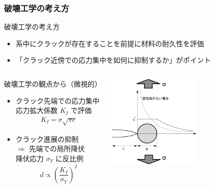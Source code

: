 \documentclass[11pt, dvipdfmx]{beamer}
\begin{document}
\begin{frame}
\frametitle{破壊工学の考え方}
\begin{exampleblock}{破壊工学の考え方}

\begin{itemize}
\item
系中にクラックが存在することを前提に材料の耐久性を評価
\item
\alert{「クラック近傍での応力集中を如何に抑制するか」}がポイント
\end{itemize}
\end{exampleblock}

\begin{columns}[totalwidth=1\textwidth]
\begin{alertblock}{破壊工学の観点から（微視的）}
	\begin{itemize}
		\item
		クラック先端での応力集中\\ \alert{応力拡大係数 $K_I$ で評価}
		\footnotesize
		\begin{align*}
		K_{I} = \sigma \sqrt{\pi c}
		\end{align*}
		\normalsize
		\item 
		クラック進展の抑制 \\
		$\Rightarrow$ 先端での\alert{局所降伏}\\
		降伏応力 $\sigma_Y$ に反比例
		\footnotesize
		\begin{align*}
		d \propto \left( \dfrac{K_I}{\sigma_Y} \right)^2
		\end{align*}
		\normalsize
	\end{itemize}
\end{alertblock}
	\centering
	\includegraphics[width=45mm]{./fig/Crack_Yield.pdf}
\end{columns}

\end{frame}
\end{document}
